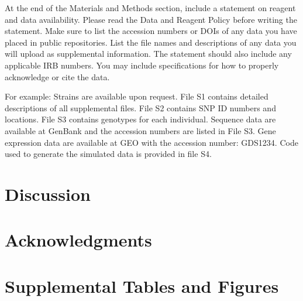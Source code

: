 \documentclass[9pt,twocolumn,twoside,lineno]{gsajnl}
\begin{document}
At the end of the Materials and Methods section, include a statement on reagent and data availability. Please read the Data and Reagent Policy before writing the statement. Make sure to list the accession numbers or DOIs of any data you have placed in public repositories. List the file names and descriptions of any data you will upload as supplemental information. The statement should also include any applicable IRB numbers. You may include specifications for how to properly acknowledge or cite the data.

For example: Strains are available upon request. File S1 contains detailed descriptions of all supplemental files. File S2 contains SNP ID numbers and locations. File S3 contains genotypes for each individual. Sequence data are available at GenBank and the accession numbers are listed in File S3. Gene expression data are available at GEO with the accession number: GDS1234. Code used to generate the simulated data is provided in file S4. 


\section{Discussion}
\label{sec:discusion}

\section{Acknowledgments}
\label{sec:acknowledgments}



\section*{Supplemental Tables and Figures}

\renewcommand{\thefigure}{S\arabic{figure}}
\linenumbers

\setcounter{figure}{0}
\end{document}
